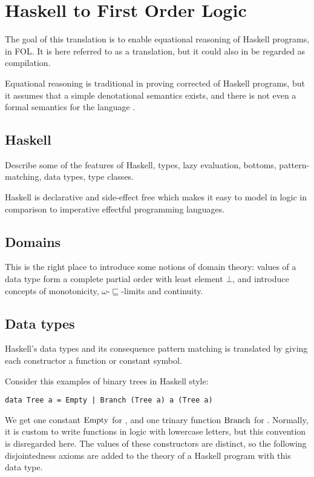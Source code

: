 \chapter{Haskell to First Order Logic}

The goal of this translation is to enable equational reasoning of
Haskell programs, in FOL. It is here referred to as a translation, but
it could also in be regarded as compilation.

Equational reasoning is traditional in proving corrected of Haskell
programs, but it assumes that a simple denotational semantics exists,
and there is not even a formal semantics for the language
\cite{chasingbot}.

\section{Haskell}

Describe some of the features of Haskell, types, lazy evaluation,
bottoms, pattern-matching, data types, type classes.

Haskell is declarative and side-effect free which makes it easy
to model in logic in comparison to imperative effectful programming languages.

\section{Domains}

This is the right place to introduce some notions of domain theory:
values of a data type form a complete partial order with least element
$\bot$, and introduce concepts of monotonicity,
$\omega$-$\sqsubseteq$-limits and continuity.

\section{Data types}

Haskell's data types and its consequence pattern matching is
translated by giving each constructor a function or constant symbol.

Consider this examples of binary trees in Haskell style:

\begin{verbatim}
data Tree a = Empty | Branch (Tree a) a (Tree a)
\end{verbatim}

We get one constant $\mathrm{Empty}$ for , and one trinary
function $\mathrm{Branch}$ for . Normally, it is custom
to write functions in logic with lowercase letters, but this
convention is disregarded here. The values of these constructors are
distinct, so the following disjointedness axioms are added to the
theory of a Haskell program with this data type.

